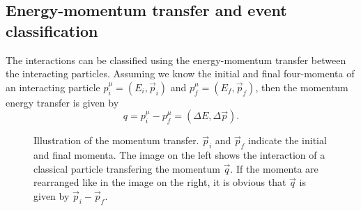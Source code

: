 \subsection{Energy-momentum transfer and event classification}

The interactions can be classified using the energy-momentum transfer between the interacting particles.
Assuming we know the initial and final four-momenta of an interacting particle $p_i^\mu = (E_i, \vec{p}_i)$ and $p_f^\mu = (E_f, \vec{p}_f)$, then the momentum energy transfer is given by
\begin{equation*}
  q = p_i^\mu - p_f^\mu = (\Delta E, \Delta \vec{p}).
\end{equation*}

\begin{figure}
  \centering
  \vspace{1em}
  \hspace*{4em}
  \vspace{1em}
  \caption{%
    Illustration of the momentum transfer.
    $\vec{p}_i$ and $\vec{p}_f$ indicate the initial and final momenta.
    The image on the left shows the interaction of a classical particle transfering the momentum $\vec{q}$.
    If the momenta are rearranged like in the image on the right, it is obvious that $\vec{q}$ is given by $\vec{p}_i - \vec{p}_f$.
  }
  \label{fig:q}
\end{figure}

